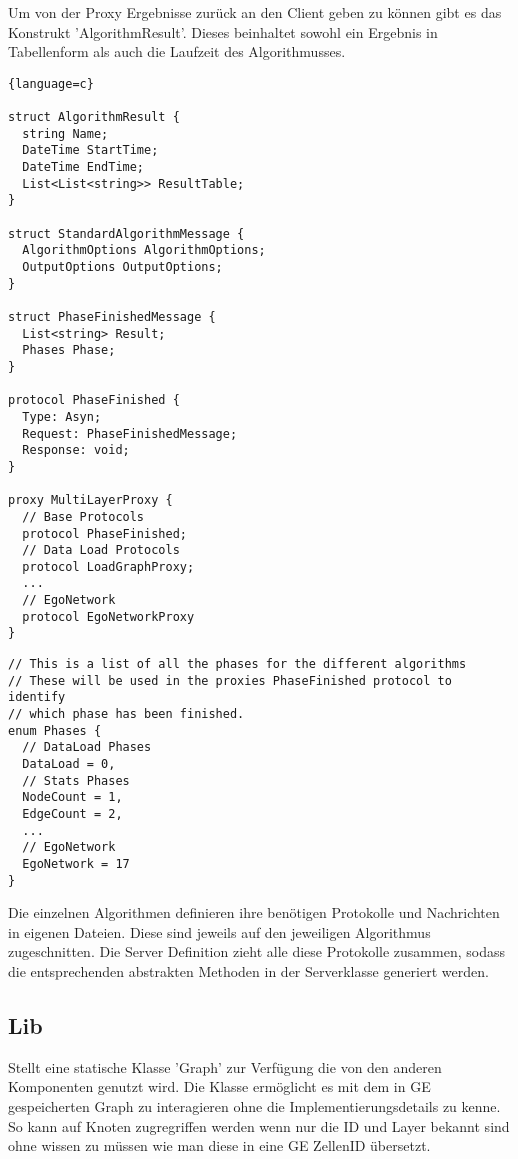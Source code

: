 Um von der Proxy Ergebnisse zurück an den Client geben zu können gibt es das Konstrukt 'AlgorithmResult'. Dieses beinhaltet sowohl ein Ergebnis in Tabellenform als auch die Laufzeit des Algorithmusses.


\begin{lstlisting}{language=c}

struct AlgorithmResult {
  string Name;
  DateTime StartTime;
  DateTime EndTime;
  List<List<string>> ResultTable;
}

struct StandardAlgorithmMessage {
  AlgorithmOptions AlgorithmOptions;
  OutputOptions OutputOptions;
}

struct PhaseFinishedMessage {
  List<string> Result;
  Phases Phase;
}

protocol PhaseFinished {
  Type: Asyn;
  Request: PhaseFinishedMessage;
  Response: void;
}

proxy MultiLayerProxy {
  // Base Protocols
  protocol PhaseFinished;
  // Data Load Protocols
  protocol LoadGraphProxy;
  ...
  // EgoNetwork
  protocol EgoNetworkProxy
}
\end{lstlisting}


\begin{lstlisting}
// This is a list of all the phases for the different algorithms
// These will be used in the proxies PhaseFinished protocol to identify
// which phase has been finished.
enum Phases {
  // DataLoad Phases
  DataLoad = 0,
  // Stats Phases
  NodeCount = 1,
  EdgeCount = 2,
  ...
  // EgoNetwork
  EgoNetwork = 17
}
\end{lstlisting}


Die einzelnen Algorithmen definieren ihre benötigen Protokolle und Nachrichten in eigenen Dateien. Diese sind jeweils auf den jeweiligen Algorithmus zugeschnitten.
Die Server Definition zieht alle diese Protokolle zusammen, sodass die entsprechenden abstrakten Methoden in der Serverklasse generiert werden.

\subsection{Lib}


Stellt eine statische Klasse 'Graph' zur Verfügung die von den anderen Komponenten genutzt wird. Die Klasse ermöglicht es mit dem in GE gespeicherten Graph zu interagieren ohne die Implementierungsdetails zu kenne. So kann auf Knoten zugregriffen werden wenn nur die ID und Layer bekannt sind ohne wissen zu müssen wie man diese in eine GE ZellenID übersetzt.


